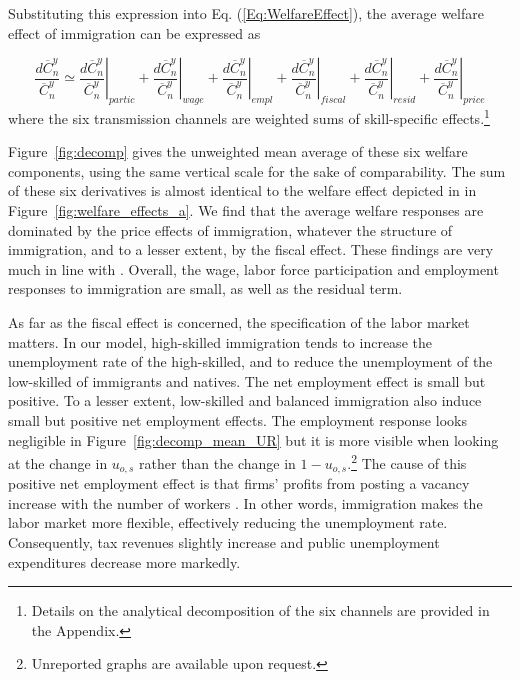 \documentclass[a4paper,12pt]{article}
\begin{document}
Substituting this expression into Eq. (\ref{Eq:WelfareEffect}), the average welfare effect of immigration can be expressed as

\begin{equation}
\frac{d\overline{C}_{n}^{y}}{\overline{C}_{n}^{y}}\simeq \left. \frac{d%
\overline{C}_{n}^{y}}{\overline{C}_{n}^{y}}\right \vert _{partic}+\left. 
\frac{d\overline{C}_{n}^{y}}{\overline{C}_{n}^{y}}\right \vert _{wage}+\left. 
\frac{d\overline{C}_{n}^{y}}{\overline{C}_{n}^{y}}\right \vert _{empl}+\left. 
\frac{d\overline{C}_{n}^{y}}{\overline{C}_{n}^{y}}\right \vert
_{fiscal}+\left. \frac{d\overline{C}_{n}^{y}}{\overline{C}_{n}^{y}}%
\right \vert _{resid}+\left. \frac{d\overline{C}_{n}^{y}}{\overline{C}_{n}^{y}%
}\right \vert _{price}
\label{Eq:DecompPrivateCons2}
\end{equation}
where the six transmission channels are weighted sums of skill-specific effects.\footnote{Details on the analytical decomposition of the six channels are provided in the Appendix.}

Figure~\ref{fig:decomp} gives the unweighted mean average of these six welfare components, using the same vertical scale for the sake of comparability. The sum of these six derivatives is almost identical to the welfare effect depicted in in Figure~\ref{fig:welfare_effects_a}. We find that the average welfare responses are dominated by the price effects of immigration, whatever the structure of immigration, and to a lesser extent, by the fiscal effect. These findings are very much in line with \citet{Aubry2016}. Overall, the wage, labor force participation and employment responses to immigration are small, as well as the residual term.

As far as the fiscal effect is concerned, the specification of the labor market matters. In our model, high-skilled immigration tends to increase the unemployment rate of the high-skilled, and to reduce the unemployment of the low-skilled of immigrants and natives. The net employment effect is small but positive. To a lesser extent, low-skilled and balanced immigration also induce small but positive net employment effects. The employment response looks negligible in Figure~\ref{fig:decomp_mean_UR} but it is more visible when looking at the change in $u_{o,s}$ rather than the change in $1-u_{o,s}$.\footnote{Unreported graphs are available upon request.} The cause of this positive net employment effect is that firms' profits from posting a vacancy increase with the number of workers \citep[as in][]{Battisti2018}. In other words, immigration  makes the  labor market  more  flexible,  effectively  reducing  the  unemployment  rate. Consequently, tax revenues slightly increase and public unemployment expenditures decrease more markedly.
\end{document}
